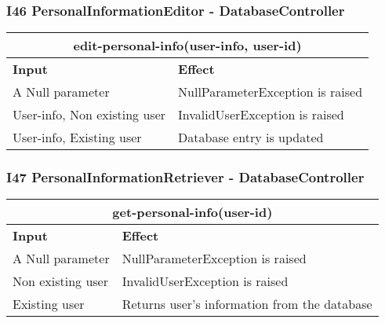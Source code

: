 \subsubsection{I46 PersonalInformationEditor - DatabaseController}
\begin{tabular}{|p{5cm}|p{7cm}|}
\hline
\multicolumn{2}{|c|}{edit-personal-info(user-info, user-id)} \\
\hline
\textbf{Input} & \textbf{Effect} \\

\hline
A Null parameter & NullParameterException is raised \\

\hline
User-info, Non existing user & InvalidUserException is raised \\

\hline
User-info, Existing user & Database entry is updated \\
\hline
\end{tabular}
\subsubsection{I47 PersonalInformationRetriever - DatabaseController}
\begin{tabular}{|p{5cm}|p{7cm}|}
\hline
\multicolumn{2}{|c|}{get-personal-info(user-id)} \\
\hline
\textbf{Input} & \textbf{Effect} \\

\hline
A Null parameter & NullParameterException is raised \\

\hline
Non existing user & InvalidUserException is raised \\

\hline
Existing user & Returns user's information from the database \\
\hline
\end{tabular}

